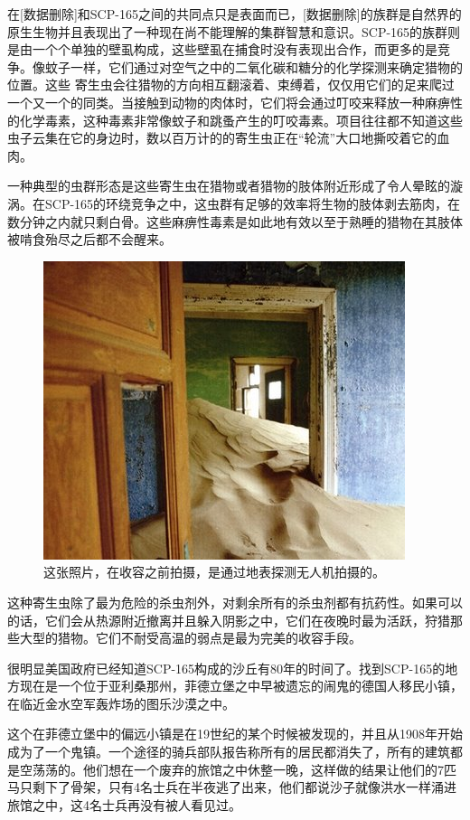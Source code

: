 在{[}数据删除]和SCP-165之间的共同点只是表面而已，{[}数据删除]的族群是自然界的原生生物并且表现出了一种现在尚不能理解的集群智慧和意识。SCP-165的族群则是由一个个单独的壁虱构成，这些壁虱在捕食时没有表现出合作，而更多的是竞争。像蚊子一样，它们通过对空气之中的二氧化碳和糖分的化学探测来确定猎物的位置。这些 寄生虫会往猎物的方向相互翻滚着、束缚着，仅仅用它们的足来爬过一个又一个的同类。当接触到动物的肉体时，它们将会通过叮咬来释放一种麻痹性的化学毒素，这种毒素非常像蚊子和跳蚤产生的叮咬毒素。项目往往都不知道这些虫子云集在它的身边时，数以百万计的的寄生虫正在“轮流”大口地撕咬着它的血肉。

一种典型的虫群形态是这些寄生虫在猎物或者猎物的肢体附近形成了令人晕眩的漩涡。在SCP-165的环绕竞争之中，这虫群有足够的效率将生物的肢体剥去筋肉，在数分钟之内就只剩白骨。这些麻痹性毒素是如此地有效以至于熟睡的猎物在其肢体被啃食殆尽之后都不会醒来。

\begin{figure}[H]
    \centering
    \includegraphics[width=0.5\linewidth]{images/SCP-165-3.jpg}
    \caption*{这张照片，在收容之前拍摄，是通过地表探测无人机拍摄的。}
\end{figure}

这种寄生虫除了最为危险的杀虫剂外，对剩余所有的杀虫剂都有抗药性。如果可以的话，它们会从热源附近撤离并且躲入阴影之中，它们在夜晚时最为活跃，狩猎那些大型的猎物。它们不耐受高温的弱点是最为完美的收容手段。

\hr

很明显美国政府已经知道SCP-165构成的沙丘有80年的时间了。找到SCP-165的地方现在是一个位于亚利桑那州，菲德立堡之中早被遗忘的闹鬼的德国人移民小镇，在临近金水空军轰炸场的图乐沙漠之中。

这个在菲德立堡中的偏远小镇是在19世纪的某个时候被发现的，并且从1908年开始成为了一个鬼镇。一个途径的骑兵部队报告称所有的居民都消失了，所有的建筑都是空荡荡的。他们想在一个废弃的旅馆之中休整一晚，这样做的结果让他们的7匹马只剩下了骨架，只有4名士兵在半夜逃了出来，他们都说沙子就像洪水一样涌进旅馆之中，这4名士兵再没有被人看见过。


